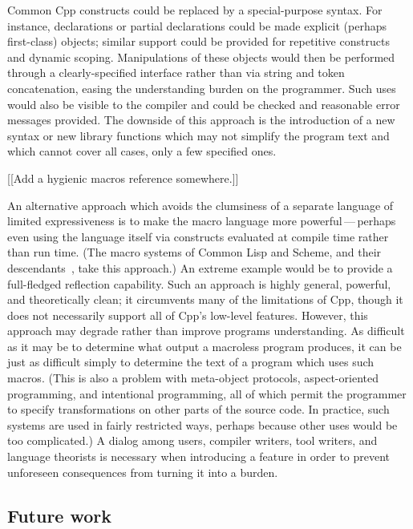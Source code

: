 \documentclass[10pt]{article}
\begin{document}
Common Cpp constructs could be replaced by a special-purpose syntax.  For
instance, declarations or partial declarations could be made explicit
(perhaps first-class) objects; similar support could be provided for
repetitive constructs and dynamic scoping.  Manipulations of these objects
would then be performed through a clearly-specified interface rather than
via string and token concatenation, easing the understanding burden on the
programmer.  Such uses would also be visible to the compiler and could be
checked and reasonable error messages provided.  The downside of this
approach is the introduction of a new syntax or new library functions which
may not simplify the program text and which cannot cover all cases, only a
few specified ones.

[[Add a hygienic macros reference somewhere.]]

An alternative approach which avoids the clumsiness of a separate language
of limited expressiveness is to make the macro language more
powerful\,---\,perhaps even using the language itself via constructs
evaluated at compile time rather than run time.  (The macro systems of
Common Lisp and Scheme, and their descendants~\cite{WeiseC93}, take this
approach.)  An extreme example would be to provide a full-fledged
reflection capability.  Such an approach is highly general, powerful, and
theoretically clean; it circumvents many of the limitations of Cpp,
though it does not necessarily support all of Cpp's low-level features.
However, this approach may degrade rather than improve programs
understanding.  As difficult as it may be to determine what output a
macroless program produces, it can be just as difficult simply to determine
the text of a program which uses such macros.  (This is also a problem with
meta-object protocols, aspect-oriented programming, and intentional
programming, all of which permit the programmer to specify transformations
on other parts of the source code.  In practice, such systems are used in
fairly restricted ways, perhaps because other uses would be too
complicated.)  A dialog among users, compiler writers, tool writers, and
language theorists is necessary when introducing a feature in order to
prevent unforeseen consequences from turning it into a burden.


\subsection{Future work}
 
\end{document}
